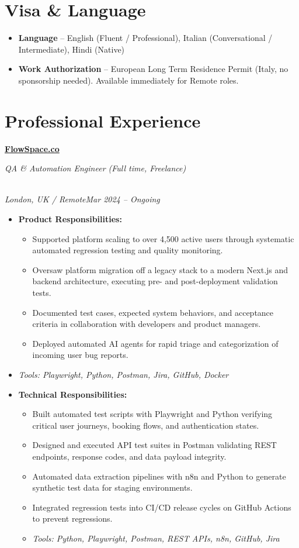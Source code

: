 \documentclass[a4paper,10pt]{article}
\newcommand{\role}[4]{\vspace{3pt}\noindent\hspace{0.6em}\parbox[t]{0.38\textwidth}{\raggedright\textbf{#1}}\hfill\parbox[t]{0.58\textwidth}{\raggedleft\textit{#2}}\\{\textit{#3}\hfill\textit{#4}}\vspace{1pt}}
\begin{document}
\section{Visa \& Language}
\begin{itemize}
\item \textbf{Language} -- English (Fluent / Professional), Italian (Conversational / Intermediate), Hindi (Native)
\item \textbf{Work Authorization} -- European Long Term Residence Permit (Italy, no sponsorship needed). Available immediately for Remote roles.
\end{itemize}

\section{Professional Experience}
\role{\href{https://flowspace.co}{FlowSpace.co}}{QA \& Automation Engineer (Full time, Freelance)}{London, UK / Remote}{Mar 2024 -- Ongoing}
\begin{itemize}
\item \textbf{Product Responsibilities:}
\begin{itemize}[label=--]
\item Supported platform scaling to over 4,500 active users through systematic automated regression testing and quality monitoring.
\item Oversaw platform migration off a legacy stack to a modern Next.js and backend architecture, executing pre- and post-deployment validation tests.
\item Documented test cases, expected system behaviors, and acceptance criteria in collaboration with developers and product managers.
\item Deployed automated AI agents for rapid triage and categorization of incoming user bug reports.
\end{itemize}
\item \textit{Tools: Playwright, Python, Postman, Jira, GitHub, Docker}
\item \textbf{Technical Responsibilities:}
\begin{itemize}[label=--]
\item Built automated test scripts with Playwright and Python verifying critical user journeys, booking flows, and authentication states.
\item Designed and executed API test suites in Postman validating REST endpoints, response codes, and data payload integrity.
\item Automated data extraction pipelines with n8n and Python to generate synthetic test data for staging environments.
\item Integrated regression tests into CI/CD release cycles on GitHub Actions to prevent regressions.
\item \textit{Tools: Python, Playwright, Postman, REST APIs, n8n, GitHub, Jira}
\end{itemize}
\end{itemize}
\end{document}
